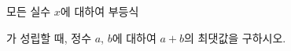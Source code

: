 모든 실수 $x$에 대하여 부등식\par\smallskip{}\par\smallskip\noindent 가 성립할 때, 정수 $a$, $b$에 대하여 $a+b$의 최댓값을 구하시오.
